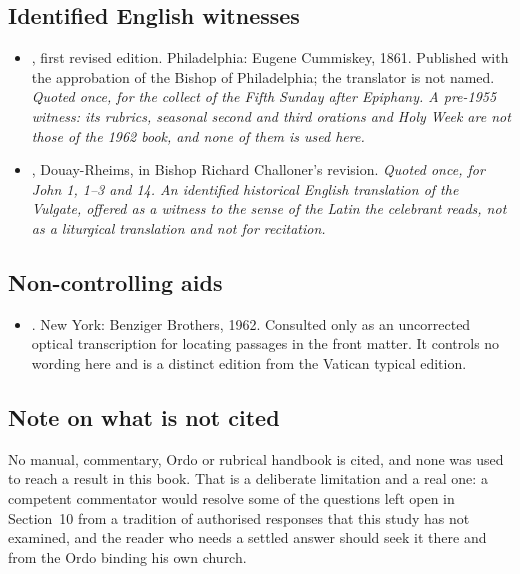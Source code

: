 \subsection*{Identified English witnesses}

\begin{itemize}
\item {}, first revised edition. Philadelphia: Eugene Cummiskey, 1861.
Published with the approbation of the Bishop of Philadelphia; the translator is
not named. \emph{Quoted once, for the collect of the Fifth Sunday after
Epiphany. A pre-1955 witness: its rubrics, seasonal second and third orations
and Holy Week are not those of the 1962 book, and none of them is used here.}

\item {}, Douay-Rheims, in Bishop Richard Challoner's
revision. \emph{Quoted once, for John 1, 1--3 and 14. An identified historical
English translation of the Vulgate, offered as a witness to the sense of the
Latin the celebrant reads, not as a liturgical translation and not for
recitation.}
\end{itemize}

\subsection*{Non-controlling aids}

\begin{itemize}
\item {}. New York: Benziger
Brothers, 1962. Consulted only as an uncorrected optical transcription for
locating passages in the front matter. It controls no wording here and is a
distinct edition from the Vatican typical edition.
\end{itemize}

\subsection*{Note on what is not cited}

No manual, commentary, Ordo or rubrical handbook is cited, and none was used
to reach a result in this book. That is a deliberate limitation and a real
one: a competent commentator would resolve some of the questions left open in
Section~10 from a tradition of authorised responses that this study has not
examined, and the reader who needs a settled answer should seek it there and
from the Ordo binding his own church.

